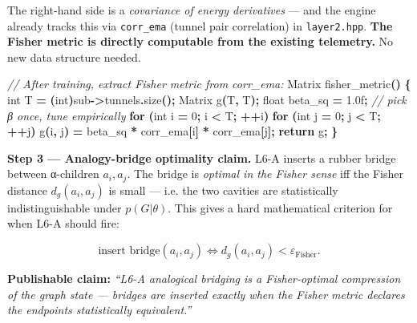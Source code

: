 \documentclass[
  11pt,
  a4paper,
]{article}
\newenvironment{Shaded}{\begin{snugshade}}{\end{snugshade}}
\newcommand{\BuiltInTok}[1]{#1}
\newcommand{\CommentTok}[1]{\textcolor[rgb]{0.56,0.35,0.01}{\textit{#1}}}
\newcommand{\ControlFlowTok}[1]{\textcolor[rgb]{0.13,0.29,0.53}{\textbf{#1}}}
\newcommand{\DataTypeTok}[1]{\textcolor[rgb]{0.13,0.29,0.53}{#1}}
\newcommand{\DecValTok}[1]{\textcolor[rgb]{0.00,0.00,0.81}{#1}}
\newcommand{\FloatTok}[1]{\textcolor[rgb]{0.00,0.00,0.81}{#1}}
\newcommand{\NormalTok}[1]{#1}
\newcommand{\OperatorTok}[1]{\textcolor[rgb]{0.81,0.36,0.00}{\textbf{#1}}}
\begin{document}
The right-hand side is a \emph{covariance of energy derivatives} --- and
the engine already tracks this via \texttt{corr\_ema} (tunnel pair
correlation) in \texttt{layer2.hpp}. \textbf{The Fisher metric is
directly computable from the existing telemetry.} No new data structure
needed.

\begin{Shaded}
\begin{Highlighting}[]
\CommentTok{// After training, extract Fisher metric from corr\_ema:}
\NormalTok{Matrix fisher\_metric}\OperatorTok{()} \OperatorTok{\{}
    \DataTypeTok{int}\NormalTok{ T }\OperatorTok{=} \OperatorTok{(}\DataTypeTok{int}\OperatorTok{)}\NormalTok{sub}\OperatorTok{{-}\textgreater{}}\NormalTok{tunnels}\OperatorTok{.}\NormalTok{size}\OperatorTok{();}
\NormalTok{    Matrix g}\OperatorTok{(}\NormalTok{T}\OperatorTok{,}\NormalTok{ T}\OperatorTok{);}
    \DataTypeTok{float}\NormalTok{ beta\_sq }\OperatorTok{=} \FloatTok{1.0}\BuiltInTok{f}\OperatorTok{;}   \CommentTok{// pick β once, tune empirically}
    \ControlFlowTok{for} \OperatorTok{(}\DataTypeTok{int}\NormalTok{ i }\OperatorTok{=} \DecValTok{0}\OperatorTok{;}\NormalTok{ i }\OperatorTok{\textless{}}\NormalTok{ T}\OperatorTok{;} \OperatorTok{++}\NormalTok{i}\OperatorTok{)}
        \ControlFlowTok{for} \OperatorTok{(}\DataTypeTok{int}\NormalTok{ j }\OperatorTok{=} \DecValTok{0}\OperatorTok{;}\NormalTok{ j }\OperatorTok{\textless{}}\NormalTok{ T}\OperatorTok{;} \OperatorTok{++}\NormalTok{j}\OperatorTok{)}
\NormalTok{            g}\OperatorTok{(}\NormalTok{i}\OperatorTok{,}\NormalTok{ j}\OperatorTok{)} \OperatorTok{=}\NormalTok{ beta\_sq }\OperatorTok{*}\NormalTok{ corr\_ema}\OperatorTok{[}\NormalTok{i}\OperatorTok{]} \OperatorTok{*}\NormalTok{ corr\_ema}\OperatorTok{[}\NormalTok{j}\OperatorTok{];}
    \ControlFlowTok{return}\NormalTok{ g}\OperatorTok{;}
\OperatorTok{\}}
\end{Highlighting}
\end{Shaded}

\textbf{Step 3 --- Analogy-bridge optimality claim.} L6-A inserts a
rubber bridge between α-children \(a_i, a_j\). The bridge is
\emph{optimal in the Fisher sense} iff the Fisher distance
\(d_g(a_i, a_j)\) is small --- i.e. the two cavities are statistically
indistinguishable under \(p(G|\theta)\). This gives a hard mathematical
criterion for when L6-A should fire:

\[
\text{insert bridge}(a_i, a_j) \iff d_g(a_i, a_j) < \varepsilon_\text{Fisher}.
\]

\textbf{Publishable claim:} \emph{``L6-A analogical bridging is a
Fisher-optimal compression of the graph state --- bridges are inserted
exactly when the Fisher metric declares the endpoints statistically
equivalent.''}
\end{document}

